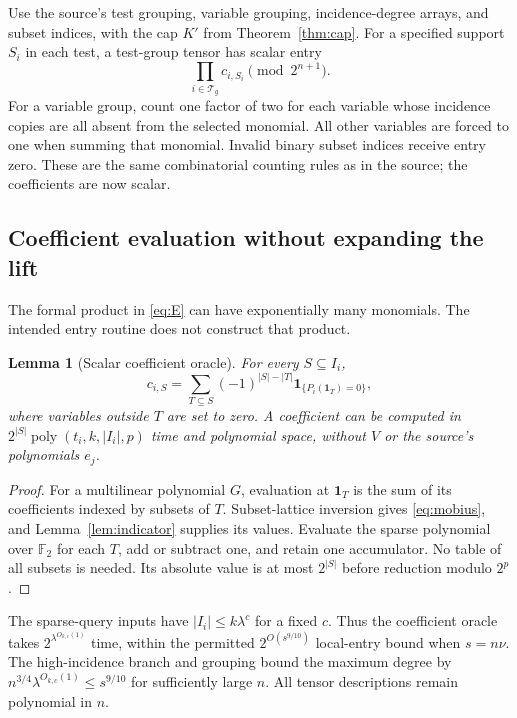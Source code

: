 \documentclass[11pt]{article}
\newtheorem{lemma}[theorem]{Lemma}
\theoremstyle{definition}
\theoremstyle{remark}
\newcommand{\poly}{\operatorname{poly}}
\newcommand{\F}{\mathbb F}
\newcommand{\ind}{\mathbf 1}
\begin{document}
Use the source's test grouping, variable grouping, incidence-degree arrays,
and subset indices, with the cap $K'$ from Theorem~\ref{thm:cap}. For a
specified support $S_i$ in each test, a test-group tensor has scalar entry
\begin{equation}\label{eq:test-entry}
 \prod_{i\in\mathcal T_g} c_{i,S_i}\pmod{2^{n+1}}.
\end{equation}
For a variable group, count one factor of two for each variable whose incidence
copies are all absent from the selected monomial. All other variables are
forced to one when summing that monomial. Invalid binary subset indices receive
entry zero. These are the same combinatorial counting rules as in the source;
the coefficients are now scalar.

\subsection{Coefficient evaluation without expanding the lift}
The formal product in \eqref{eq:E} can have exponentially many monomials.
The intended entry routine does not construct that product.

\begin{lemma}[Scalar coefficient oracle]\label{lem:oracle}
For every $S\subseteq I_i$,
\begin{equation}\label{eq:mobius}
 c_{i,S}=\sum_{T\subseteq S}(-1)^{|S|-|T|}
                       \ind_{\{P_i(\mathbf1_T)=0\}},
\end{equation}
where variables outside $T$ are set to zero. A coefficient can be computed in
$2^{|S|}\poly(t_i,k,|I_i|,p)$ time and polynomial space, without $V$ or
the source's polynomials $e_j$.
\end{lemma}
\begin{proof}
For a multilinear polynomial $G$, evaluation at $\mathbf1_T$ is the sum
of its coefficients indexed by subsets of $T$. Subset-lattice inversion gives
\eqref{eq:mobius}, and Lemma~\ref{lem:indicator} supplies its values. Evaluate
the sparse polynomial over $\F_2$ for each $T$, add or subtract one, and
retain one accumulator. No table of all subsets is needed. Its absolute value
is at most $2^{|S|}$ before reduction modulo $2^p$.
\end{proof}

The sparse-query inputs have $|I_i|\le k\lambda^c$ for a fixed $c$.
Thus the coefficient oracle takes $2^{\lambda^{O_{k,c}(1)}}$ time, within
the permitted $2^{O(s^{9/10})}$ local-entry bound when $s=n\nu$.
The high-incidence branch and grouping bound the maximum degree by
$n^{3/4}\lambda^{O_{k,c}(1)}\le s^{9/10}$ for sufficiently large $n$.
All tensor descriptions remain polynomial in $n$.
\end{document}
